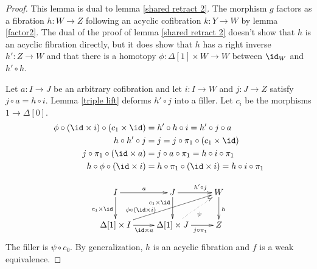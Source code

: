 \documentclass{tac}
\newcommand\hide[1]{}
\newcommand\of{:}
\newcommand\simplex\Delta
\begin{document}
\begin{proof} \hide{The morphism $g$ factors as a fibration $h\of W\to Z$ following an acyclic cofibration $k\of Y\to W$ by lemma \ref{factor2}. Lifting properties give $h$ a right inverse $h'$.
\[\xymatrix{
X\ar[r]^{k\circ f}\ar[d]_{g\circ f} & W\ar[d]^h\\
Z\ar[r]_\id \ar[ur]^{h'} & Z
}\]
Lemma \ref{triple lift} provides a homotopy $\phi$ between $\id_W$ and $h'\circ h$, because the following equations hold.
\begin{align*}
(\id,h'\circ h)\circ(k\circ f+k\circ f)&= (k\circ f,k\circ f) = (k\circ f\circ \pi_1)\circ(c\times \id_Y)\\
h\circ(k\circ f\circ\pi_1) &= g\circ f\circ\pi_1 = (h\circ\pi_1)\circ(\id_{\simplex[1]}\times (k\circ f))\\
h\circ(\id_W,h'\circ h) &= (h,h) = (h\circ\pi_1)\circ(c\times\id_W)
\end{align*}

\[\xymatrix{
X+X\ar[r]^{k\circ f+k\circ f}\ar[d]_{c\times \id} & W+W\ar[r]^(.6){(\id,h'\circ h)}\ar[d]_(.3){c\times\id} & W\ar[d]^h\\
\simplex[1]\times X\ar[r]_{\id\times (k\circ f)}\ar[urr]^(.3){k\circ f\circ\pi_1} & \simplex[1]\times W\ar[r]_(.6){h\circ \pi_1}\ar@{.>}[ur]_{\phi} & Y
}\]}

This lemma is dual to lemma \ref{shared retract 2}. The morphism $g$ factors as a fibration $h\of W\to Z$ following an acyclic cofibration $k\of Y\to W$ by lemma \ref{factor2}. The dual of the proof of lemma \ref{shared retract 2} doesn't show that $h$ is an acyclic fibration directly, but it does show that $h$ has a right inverse $h'\of Z\to W$ and that there is a homotopy $\phi\of\simplex[1]\times W\to W$ between $\id_W$ and $h'\circ h$.

Let $a\of I\to J$ be an arbitrary cofibration and let $i\of I\to W$ and $j\of J\to Z$ satisfy $j\circ a=h\circ i$. Lemma \ref{triple lift} deforms $h'\circ j$ into a filler. Let $c_i$ be the morphisms $1\to \simplex[0]$.
\begin{align*}
\phi\circ(\id\times i)\circ (c_1\times \id) &= h'\circ h\circ i = h'\circ j\circ a \\
h\circ h' \circ j &= j = j\circ \pi_1\circ(c_1\times\id) \\
j\circ \pi_1\circ (\id\times a) &= j\circ a\circ \pi_1 = h\circ i \circ \pi_1\\
h\circ \phi\circ(\id\times i) &= h \circ \pi_1 \circ (\id\times i) = h\circ i \circ \pi_1
\end{align*}

\[\xymatrix{
I\ar[r]^{a}\ar[d]_{c_1\times \id} & J\ar[r]^(.6){h'\circ j}\ar[d]_(.3){c_1\times\id} & W\ar[d]^h\\
\simplex[1]\times I\ar[r]_{\id\times a}\ar[urr]^(.3){\phi\circ(\id\times i)} & \simplex[1]\times J\ar[r]_(.6){j\circ \pi_1}\ar@{.>}[ur]_{\psi} & Z
}\]
The filler is $\psi\circ c_0$. By generalization, $h$ is an acyclic fibration and $f$ is a weak equivalence.
\end{proof}
\end{document}
